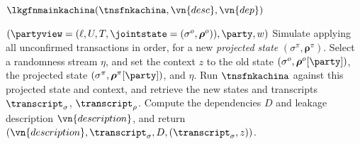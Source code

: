 \begin{leakagefnsketch}{$\lkgfnmainkachina(\tnsfnkachina, \vn{desc}, \vn{dep})$}
  \vspace{-1em}
  \begin{receiveinputsketch*}{$(\partyview = (\ell, U, T, \jointstate = (\sigma^o, \boldsymbol\rho^o)), \party, w)$}
    Simulate applying all unconfirmed transactions in order, for a new
    \emph{projected state}  $(\sigma^\pi, \boldsymbol\rho^\pi)$. Select a randomness stream
    $\eta$, and set the context $z$ to the old state $(\sigma^o,
    \boldsymbol\rho^o[\party])$, the projected state $(\sigma^\pi, \boldsymbol\rho^\pi[\party])$, and
    $\eta$. Run $\tnsfnkachina$ against this projected state and context, and
    retrieve the new states and transcripts $\transcript_\sigma$,
    $\transcript_\rho$. Compute the dependencies $D$ and leakage description
    $\vn{description}$, and return $(\vn{description}, \transcript_\sigma, D,
    (\transcript_\sigma, z))$.
  \end{receiveinputsketch*}
\end{leakagefnsketch}


